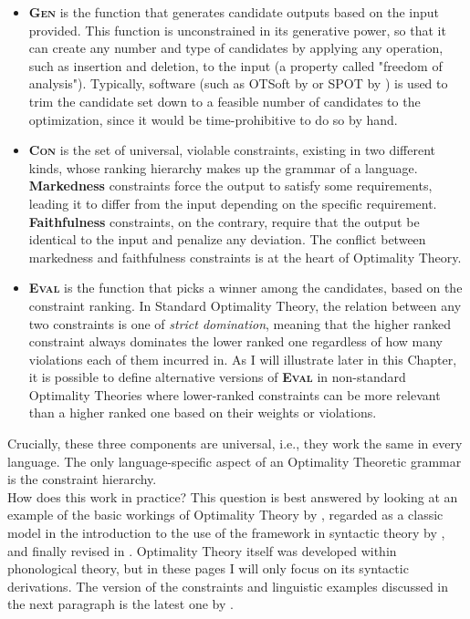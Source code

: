 \begin{itemize}
    \item \textsc{\textbf{Gen}} is the function that generates candidate outputs based on the input provided. This function is unconstrained in its generative power, so that it can create any number and type of candidates by applying any operation, such as insertion and deletion, to the input (a property called "freedom of analysis"). Typically, software (such as OTSoft by \textcite{hayes2003otsoft} or SPOT by \textcite{bellik2019automated}) is used to trim the candidate set down to a feasible number of candidates to the optimization, since it would be time-prohibitive to do so by hand.
    \item \textsc{\textbf{Con}} is the set of universal, violable constraints, existing in two different kinds, whose ranking hierarchy makes up the grammar of a language. \textbf{Markedness} constraints force the output to satisfy some requirements, leading it to differ from the input depending on the specific requirement. \textbf{Faithfulness} constraints, on the contrary, require that the output be identical to the input and penalize any deviation. The conflict between markedness and faithfulness constraints is at the heart of Optimality Theory.
    \item \textsc{\textbf{Eval}} is the function that picks a winner among the candidates, based on the constraint ranking. In Standard Optimality Theory, the relation between any two constraints is one of \textit{strict domination}, meaning that the higher ranked constraint always dominates the lower ranked one regardless of how many violations each of them incurred in. As I will illustrate later in this Chapter, it is possible to define alternative versions of \textsc{\textbf{Eval}} in non-standard Optimality Theories where lower-ranked constraints can be more relevant than a higher ranked one based on their weights or violations.
\end{itemize}
Crucially, these three components are universal, i.e., they work the same in every language. The only language-specific aspect of an Optimality Theoretic grammar is the constraint hierarchy.\\
How does this work in practice? This question is best answered by looking at an example of the basic workings of Optimality Theory by \textcite{grimshaw1998optimal}, regarded as a classic model in the introduction to the use of the framework in syntactic theory by \textcite{legendre2001introduction}, and finally revised in \textcite{legendre2019otsyntax}. Optimality Theory itself was developed \parencite{princesmolensky1993optimality} within phonological theory, but in these pages I will only focus on its syntactic derivations. The version of the constraints and linguistic examples discussed in the next paragraph is the latest one by \textcite{legendre2019otsyntax}. 


